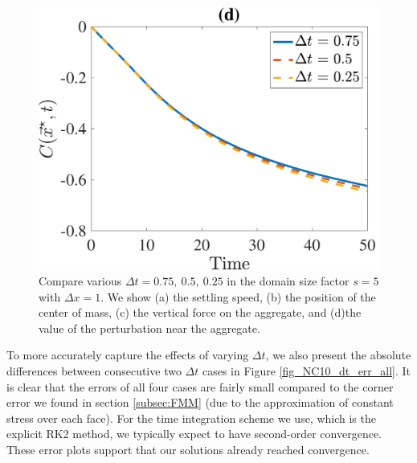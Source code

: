 \begin{figure}[ht]
\begin{center}
		\includegraphics[scale=0.35]{./figures/fig_NC10_dt_C_star}
	\caption{Compare various $\Delta t = 0.75, \ 0.5, \ 0.25$ in the domain size factor $s = 5$ with $\Delta x = 1$. We show (a) the settling speed, (b) the position of the center of mass, (c) the vertical force on the aggregate, and (d)the value of the perturbation near the aggregate.}
	\label{fig_NC10_compare_dt}
\end{center}
\end{figure}
\par
To more accurately capture the effects of varying $\Delta t$, we also present the absolute differences between consecutive two $\Delta t$ cases in Figure \ref{fig_NC10_dt_err_all}.
It is clear that the errors of all four cases are fairly small compared to the corner error we found in section \ref{subsec:FMM} (due to the approximation of constant stress over each face). For the time integration scheme we use, which is the explicit RK2 method, we typically expect to have second-order convergence. These error plots support that our solutions already reached convergence.
